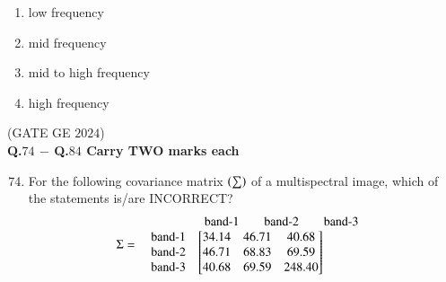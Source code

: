 \documentclass[journal,12pt,onecolumn]{IEEEtran}
\theoremstyle{remark}
\begin{document}
\begin{enumerate}
\begin{enumerate}
\item low frequency
\item mid frequency
\item mid to high frequency
\item high frequency
\end{enumerate}

\end{enumerate}
\hfill{(GATE GE $2024$)}
\bigskip
\\
\textbf{Q.$74$ $-$ Q.$84$ Carry TWO marks each}
\\
\begin{enumerate}
\setcounter{enumi}{73}
\item For the following covariance matrix $\left(\sum\right)$ of a multispectral image, which of the statements is/are INCORRECT?
\[
\Sigma =
\begin{array}{r @{\hspace{0.5em}} l}
    & 
\begin{array}{ccc}
        \text{band-$1$} & \quad \text{band-$2$} & \quad \text{band-$3$}
    \end{array} \\
\begin{array}{r}
        \text{band-$1$} \\ \text{band-$2$} \\ \text{band-$3$}
    \end{array}
    & 
\begin{bmatrix}
        34.14 & 46.71 & 40.68 \\
        46.71 & 68.83 & 69.59 \\
        40.68 & 69.59 & 248.40
    \end{bmatrix}
\end{array}
\]


\end{enumerate}
\end{document}
